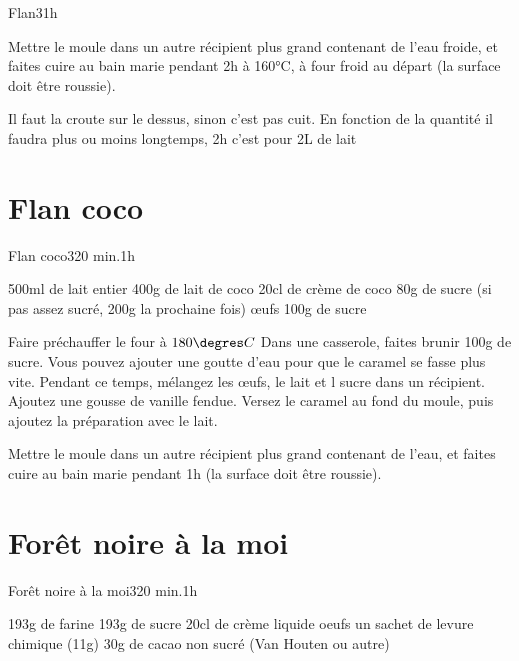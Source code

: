 {\begin{recette}{Flan}{3}{}{1h}
\begin{cuisson}
Mettre le moule dans un autre récipient plus grand contenant de l'eau froide, et faites cuire au bain marie pendant 2h à 160°C, à four froid au départ (la surface doit 
être roussie).

\begin{remarque}
Il faut la croute sur le dessus, sinon c'est pas cuit. En fonction de la quantité il faudra plus ou moins longtemps, 2h c'est pour 2L de lait
\end{remarque}
\end{cuisson}
\end{recette}

\section{Flan coco}
\begin{recette}{Flan coco}{3}{20 min.}{1h}
\begin{ingredients}
\ingredient[Flan]
\ingredient 500ml de lait entier
\ingredient 400g de lait de coco
\ingredient 20cl de crème de coco
\ingredient 80g de sucre (si pas assez sucré, 200g la prochaine fois)
 œufs
\ingredient[Caramel]
\ingredient 100g de sucre
\end{ingredients}

\begin{preparation}
\etape Faire préchauffer le four à $180\degres C$
\etape Dans une casserole, faites brunir 100g de sucre. Vous pouvez ajouter une goutte d'eau pour que le caramel se fasse plus 
vite.
\etape Pendant ce temps, mélangez les œufs, le lait et l sucre dans un récipient. Ajoutez une gousse de vanille fendue.
\etape Versez le caramel au fond du moule, puis ajoutez la préparation avec le lait.
\end{preparation}

\begin{cuisson}
Mettre le moule dans un autre récipient plus grand contenant de l'eau, et faites cuire au bain marie pendant 1h (la surface doit 
être roussie).
\end{cuisson}
\end{recette}


\section{Forêt noire à la moi}
\begin{recette}{Forêt noire à la moi}{3}{20 min.}{1h}
\begin{ingredients}
\ingredient 193g de farine
\ingredient 193g de sucre
\ingredient 20cl de crème liquide
 oeufs
\ingredient un sachet de levure chimique (11g)
\ingredient 30g de cacao non sucré (Van Houten ou autre)


\end{ingredients}
\end{recette}}
